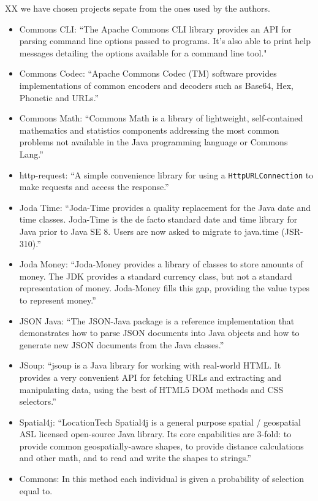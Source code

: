 \documentclass[sigconf]{acmart}
\begin{document}
XX we have chosen projects sepate from the ones used by the authors.

\begin{itemize}
  \item{Commons CLI}: ``The Apache Commons CLI library provides an API for parsing command line options 
  passed to programs. It's also able to print help messages detailing the options available for a 
  command line tool." \cite{web:commonscli} 
  \item{Commons Codec}: ``Apache Commons Codec (TM) software provides implementations of common 
  encoders and decoders such as Base64, Hex, Phonetic and URLs.'' \cite{web:commonscodec}
  \item{Commons Math}: ``Commons Math is a library of lightweight, self-contained mathematics and 
  statistics components addressing the most common problems not available in the Java programming
   language or Commons Lang.'' \cite{web:commonsmath}
  \item{http-request}: ``A simple convenience library for using a \linebreak
  \verb|HttpURLConnection| to make requests and access the response.'' \cite{web:httpreq}
  \item{Joda Time}: ``Joda-Time provides a quality replacement for the Java date and time classes.
  Joda-Time is the de facto standard date and time library for Java prior to Java SE 8. Users are
   now asked to migrate to java.time (JSR-310).'' \cite{web:jodatime}
  \item{Joda Money}: ``Joda-Money provides a library of classes to store amounts of money.
  The JDK provides a standard currency class, but not a standard representation of money. 
  Joda-Money fills this gap, providing the value types to represent money.'' \cite{web:jodamoney}
  \item{JSON Java}: ``The JSON-Java package is a reference implementation that demonstrates 
  how to parse JSON documents into Java objects and how to generate new JSON documents
  from the Java classes.'' \cite{web:jsonjava}
  \item{JSoup}: ``jsoup is a Java library for working with real-world HTML. It provides a very 
  convenient API for fetching URLs and extracting and manipulating data, using the best of HTML5 
  DOM methods and CSS selectors.'' \cite{web:jsoup}
  \item{Spatial4j}: ``LocationTech Spatial4j is a general purpose spatial / geospatial ASL licensed 
  open-source Java library. Its core capabilities are 3-fold: to provide common geospatially-aware 
  shapes, to provide distance calculations and other math, and to read and write the shapes 
  to strings.'' \cite{web:spatial4j}
  \item{Commons}: In this method each individual is given a probability of selection equal to.
\end{itemize}
\end{document}
